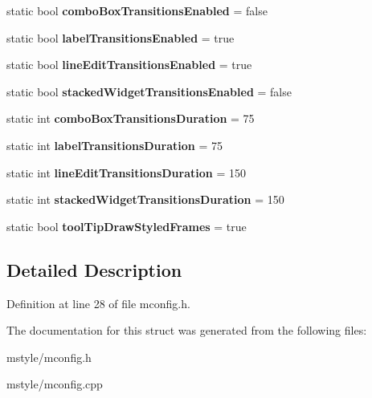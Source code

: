 \begin{DoxyCompactItemize}
\item 
\mbox{\label{struct_mg_style_config_data_ab59c0e0a3af371cdf3f33e57d065b17a}} 
static bool {\bfseries combo\+Box\+Transitions\+Enabled} = false
\item 
\mbox{\label{struct_mg_style_config_data_a8be8f9dcb37975667d072b7a28e7a635}} 
static bool {\bfseries label\+Transitions\+Enabled} = true
\item 
\mbox{\label{struct_mg_style_config_data_a13777d0dcc10c38fb428b47fcf67683b}} 
static bool {\bfseries line\+Edit\+Transitions\+Enabled} = true
\item 
\mbox{\label{struct_mg_style_config_data_a5a73c7dd79e064b8d728860c641a5225}} 
static bool {\bfseries stacked\+Widget\+Transitions\+Enabled} = false
\item 
\mbox{\label{struct_mg_style_config_data_acdbe7312f717b46a50a2ce453c129f4c}} 
static int {\bfseries combo\+Box\+Transitions\+Duration} = 75
\item 
\mbox{\label{struct_mg_style_config_data_a19f59d3ca60defa70cfefb20fb41cc64}} 
static int {\bfseries label\+Transitions\+Duration} = 75
\item 
\mbox{\label{struct_mg_style_config_data_a44a344d18bb95d8666b7f0cc1a894201}} 
static int {\bfseries line\+Edit\+Transitions\+Duration} = 150
\item 
\mbox{\label{struct_mg_style_config_data_a019a99b1bbd65d133df64c78ad2f5e14}} 
static int {\bfseries stacked\+Widget\+Transitions\+Duration} = 150
\item 
\mbox{\label{struct_mg_style_config_data_adb8f43a77a069ee39ed311cef1f468ff}} 
static bool {\bfseries tool\+Tip\+Draw\+Styled\+Frames} = true
\end{DoxyCompactItemize}


\subsection{Detailed Description}


Definition at line 28 of file mconfig.\+h.



The documentation for this struct was generated from the following files\+:\begin{DoxyCompactItemize}
\item 
mstyle/mconfig.\+h\item 
mstyle/mconfig.\+cpp\end{DoxyCompactItemize}
